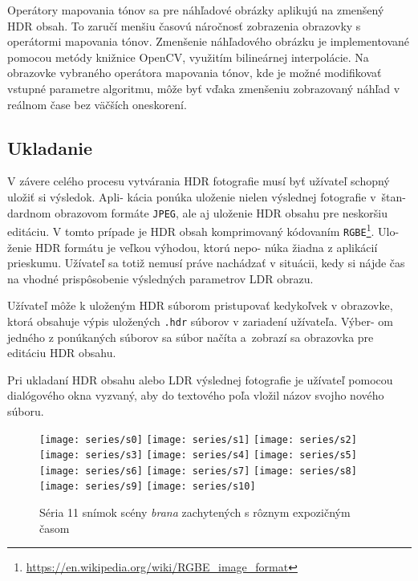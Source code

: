 \documentclass[slovak]{ExcelAtFIT}
\begin{document}
Operátory mapovania tónov sa pre náhľadové obrázky aplikujú na zmenšený HDR obsah. To zaručí menšiu časovú náročnosť zobrazenia
obrazovky s operátormi mapovania tónov. Zmenšenie náhľadového obrázku je implementované pomocou metódy knižnice OpenCV, využitím
bilineárnej interpolácie. Na obrazovke vybraného operátora mapovania tónov, kde je možné modifikovať vstupné parametre algoritmu,
môže byť vďaka zmenšeniu zobrazovaný náhľad v reálnom čase bez väčších oneskorení.

\subsection{Ukladanie}
\label{sec:Implement-Storage}

V závere celého procesu vytvárania HDR fotografie musí byť užívateľ schopný uložiť si výsledok. Apli- kácia ponúka
uloženie nielen výslednej fotografie v~štan- dardnom obrazovom formáte \texttt{JPEG}, ale aj uloženie HDR obsahu 
pre neskoršiu editáciu. V tomto prípade je HDR obsah komprimovaný kódovaním 
\texttt{RGBE}\footnote{\url{https://en.wikipedia.org/wiki/RGBE_image_format}}. Ulo- ženie HDR formátu
je veľkou výhodou, ktorú nepo- núka žiadna z aplikácií prieskumu. Užívateľ sa totiž nemusí práve nachádzať
v situácii, kedy si nájde čas na vhodné prispôsobenie výsledných parametrov LDR obrazu.

Užívateľ môže k uloženým HDR súborom pristupovať kedykoľvek v obrazovke, ktorá obsahuje výpis uložených
\texttt{.hdr} súborov v zariadení užívateľa. Výber- om jedného z ponúkaných súborov sa súbor načíta a~zobrazí 
sa obrazovka pre editáciu HDR obsahu.

Pri ukladaní HDR obsahu alebo LDR výslednej fotografie je užívateľ pomocou dialógového okna vyzvaný, aby do textového
poľa vložil názov svojho nového súboru.

\begin{figure*}[t]
	\centering
	\texttt{[image: series/s0]}
	\texttt{[image: series/s1]}
	\texttt{[image: series/s2]}
	\texttt{[image: series/s3]}
	\texttt{[image: series/s4]}
	\texttt{[image: series/s5]}
	\texttt{[image: series/s6]}
	\texttt{[image: series/s7]}
	\texttt{[image: series/s8]}
	\texttt{[image: series/s9]}
	\texttt{[image: series/s10]}
  \caption{Séria 11 snímok scény \textit{brana} zachytených s rôznym expozičným časom}
  \label{fig:BranaSeries}
\end{figure*}
\end{document}

